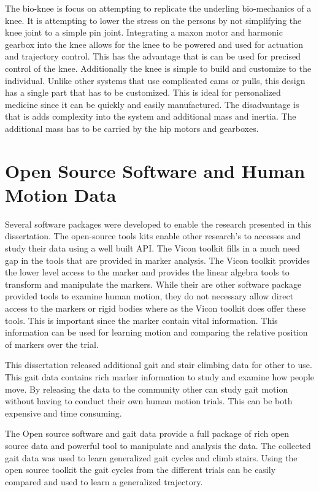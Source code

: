 The bio-knee is focus on attempting to replicate the underling bio-mechanics of a knee. It is attempting to lower the stress on the persons by not simplifying the knee joint to a simple pin joint. Integrating a maxon motor and harmonic gearbox into the knee allows for the knee to be powered and used for actuation and trajectory control. This has the advantage that is can be used for precised control of the knee. Additionally the knee is simple to build and customize to the individual. Unlike other systems that use complicated cams or pulls, this design has a single part that has to be customized. This is ideal for personalized medicine since it can be quickly and easily manufactured. The disadvantage is that is adds complexity into the system and additional mass and inertia. The additional mass has to be carried by the hip motors and gearboxes.




\section{Open Source Software and Human Motion Data}

Several software packages were developed to enable the research presented in this dissertation. The open-source tools kits enable other research's to accesses and study their data using a well built API. The Vicon toolkit fills in a much need gap in the tools that are provided in marker analysis. The Vicon toolkit provides the lower level access to the marker and provides the linear algebra tools to transform and manipulate the markers. While their are other software package provided tools to examine human motion, they do not necessary allow direct access to the markers or rigid bodies where as the Vicon toolkit does offer these tools. This is important since the marker contain vital information. This information can be used for learning motion and comparing the relative position of markers over the trial. 

This dissertation released additional gait and stair climbing data for other to use. This gait data contains rich marker information to study and examine how people move. By releasing the data to the community other can study gait motion without having to conduct their own human motion trials. This can be both expensive and time consuming. 

The Open source software and gait data provide a full package of rich open source data and powerful tool to manipulate and analysis the data. The collected gait data was used to learn generalized gait cycles and climb stairs. Using the open source toolkit the gait cycles from the different trials can be easily compared and used to learn a generalized trajectory. 


